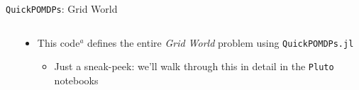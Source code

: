\begin{frame}[fragile]{\texttt{QuickPOMDPs}: Grid World}
\begin{columns}[T,onlytextwidth]
    \begin{column}{0.43\linewidth}
        \scalebox{0.28}{\usebox{\gridworldcode}}
    \end{column}
    \begin{column}{0.57\linewidth}
        {\footnotesize
        \begin{itemize}
            \item This code$^a$ defines the entire \textit{Grid World} problem using \texttt{QuickPOMDPs.jl}
            \begin{itemize}
                \item Just a sneak-peek: we'll walk through this in detail in the \texttt{Pluto} notebooks
            \end{itemize}
        \end{itemize}
        }
        \begin{figure}
            \centering
            \def\svgwidth{\columnwidth}
            \scalebox{0.7}{}
        \end{figure}
    \end{column}
\end{columns}


\end{frame}


